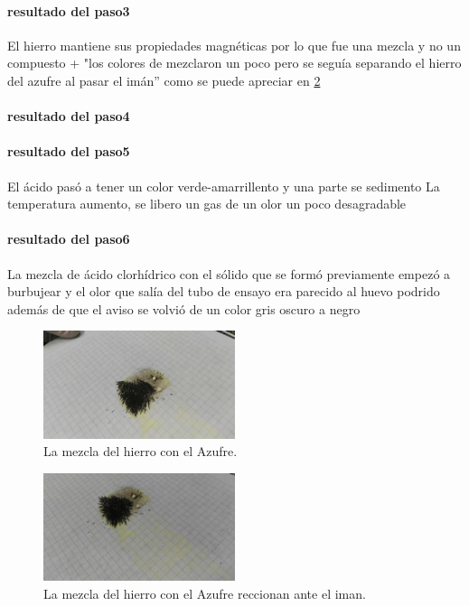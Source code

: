 \documentclass[letter]{article}
\begin{document}
\paragraph{resultado del paso3}
El hierro mantiene sus propiedades magnéticas por lo que fue una mezcla y no un compuesto
+ "los colores de mezclaron un poco pero se seguía separando el hierro del azufre al pasar el imán” como se puede apreciar en \ref{fig:obs2}
\paragraph{resultado del paso4}

\paragraph{resultado del paso5}
 El ácido pasó a tener un color verde-amarrillento y una parte se sedimento 
La temperatura aumento, se libero un gas de un olor un poco desagradable
\paragraph{resultado del paso6}
La mezcla de ácido clorhídrico con el sólido que se formó previamente empezó a burbujear y el olor que salía del tubo de ensayo era parecido al huevo podrido además de que el aviso se volvió de un color gris oscuro a negro

	
\begin{figure}
		
	\centering	
	\includegraphics[width=0.5\textwidth]{obs1}
	\caption{La mezcla del hierro con el Azufre.}
	\label{fig:obs1}
\end{figure}
\begin{figure}
	\centering	
	\includegraphics[width=0.5\textwidth]{obs2}
	\caption{La mezcla del hierro con el Azufre reccionan ante el iman.}
	\label{fig:obs2}
\end{figure}
\end{document}
